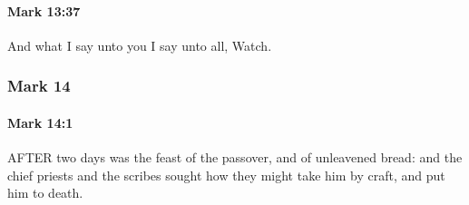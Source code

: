 		\paragraph{Mark 13:37} %
			\label{MARK-13-37}

			And what I say unto you I say unto all, Watch.

			\begin{framed}
			\scriptsize
				\begin{compactdesc}
					\item[SBLG] 
				\end{compactdesc}
			\end{framed}

	\subsubsection{Mark 14} %
		\label{MARK-14}
		
		\paragraph{Mark 14:1} %
			\label{MARK-14-1}

			AFTER two days was the feast of the passover, and of unleavened bread: and the chief priests and the scribes sought how they might take him by craft, and put him to death.

